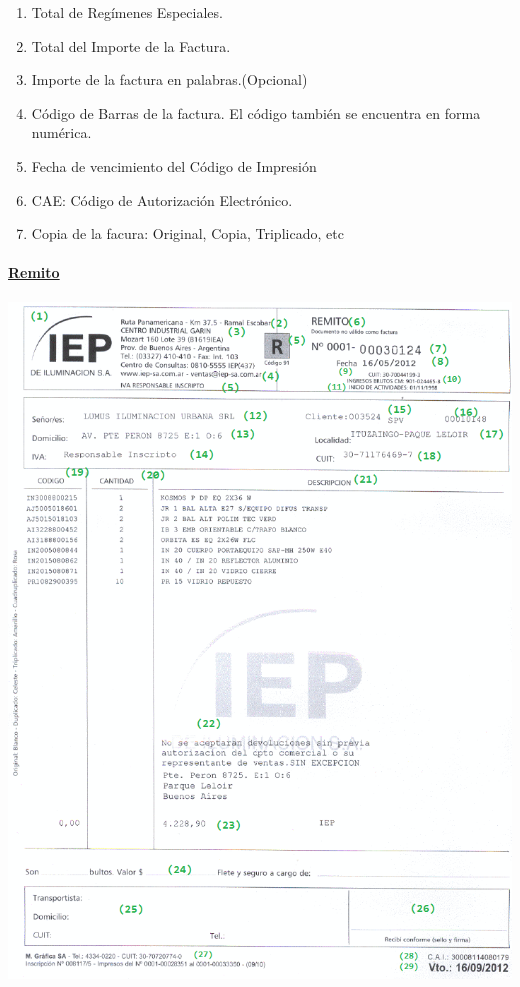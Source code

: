 \begin{enumerate}
   \item Total de Reg\'imenes Especiales.
   \item Total del Importe de la Factura.
   \item Importe de la factura en palabras.(Opcional)
   \item C\'odigo de Barras de la factura. El c\'odigo tambi\'en se encuentra en forma num\'erica. 
   \item Fecha de vencimiento del C\'odigo de Impresi\'on
   \item CAE: C\'odigo de Autorizaci\'on Electr\'onico.
   \item Copia de la facura: Original, Copia, Triplicado, etc
      
  \end{enumerate}

\paragraph{\underline{Remito}}
 \includegraphics{./Images/FormulariosIEP/Remito.png}
